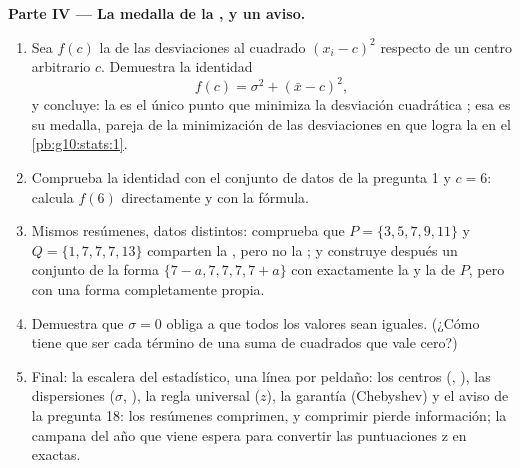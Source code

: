 \begin{problem}
\medskip
\noindent\textbf{Parte IV --- La medalla de la , y un aviso.}
\begin{enumerate}[resume]
  \item Sea $f(c)$ la  de las desviaciones al cuadrado
        $(x_i - c)^2$ respecto de un centro arbitrario $c$. Demuestra la
        identidad
        \[
        f(c) = \sigma^2 + (\bar x - c)^2 ,
        \]
        y concluye: la  es el único punto que minimiza la desviación
        cuadrática ; esa es su medalla, pareja de la minimización de
        las desviaciones en  que logra la  en el
        \cref{pb:g10:stats:1}.
  \item Comprueba la identidad con el conjunto de datos de la pregunta 1 y
        $c = 6$: calcula $f(6)$ directamente y con la fórmula.
  \item Mismos resúmenes, datos distintos: comprueba que
        $P = \{3, 5, 7, 9, 11\}$ y $Q = \{1, 7, 7, 7, 13\}$ comparten la
        , pero no la ; y construye después un conjunto de la
        forma $\{7 - a, 7, 7, 7, 7 + a\}$ con exactamente la  y la
         de $P$, pero con una forma completamente propia.
  \item Demuestra que $\sigma = 0$ obliga a que todos los valores sean
        iguales. (¿Cómo tiene que ser cada término de una suma de
        cuadrados que vale cero?)
  \item Final: la escalera del estadístico, una línea por peldaño: los
        centros (, ), las dispersiones ($\sigma$, ), la regla universal ($z$), la garantía
        (Chebyshev) y el aviso de la pregunta 18: los resúmenes comprimen,
        y comprimir pierde información; la campana del año que viene
        espera para convertir las puntuaciones z en 
        exactas.
\end{enumerate}
\end{problem}
